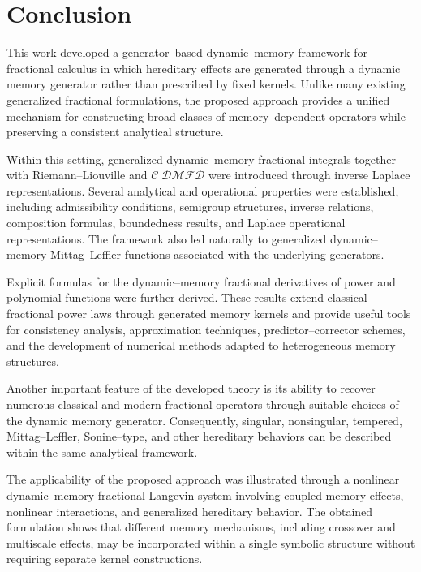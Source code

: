 \documentclass[11pt]{article}
\numberwithin{equation}{section}
\begin{document}

\section{Conclusion}
This work developed a generator--based dynamic--memory framework for fractional calculus in which hereditary effects are generated through a dynamic memory generator rather than prescribed by fixed kernels. Unlike many existing generalized fractional formulations, the proposed approach provides a unified mechanism for constructing broad classes of memory--dependent operators while preserving a consistent analytical structure.

Within this setting, generalized dynamic--memory fractional integrals together with Riemann--Liouville and $\mathcal{C\;DMFD}$ were introduced through inverse Laplace representations. Several analytical and operational properties were established, including admissibility conditions, semigroup structures, inverse relations, composition formulas, boundedness results, and Laplace operational representations. The framework also led naturally to generalized dynamic--memory Mittag--Leffler functions associated with the underlying generators.

Explicit formulas for the dynamic--memory fractional derivatives of power and polynomial functions were further derived. These results extend classical fractional power laws through generated memory kernels and provide useful tools for consistency analysis, approximation techniques, predictor--corrector schemes, and the development of numerical methods adapted to heterogeneous memory structures.

Another important feature of the developed theory is its ability to recover numerous classical and modern fractional operators through suitable choices of the dynamic memory generator. Consequently, singular, nonsingular, tempered, Mittag--Leffler, Sonine--type, and other hereditary behaviors can be described within the same analytical framework.

The applicability of the proposed approach was illustrated through a nonlinear dynamic--memory fractional Langevin system involving coupled memory effects, nonlinear interactions, and generalized hereditary behavior. The obtained formulation shows that different memory mechanisms, including crossover and multiscale effects, may be incorporated within a single symbolic structure without requiring separate kernel constructions.
\end{document}

